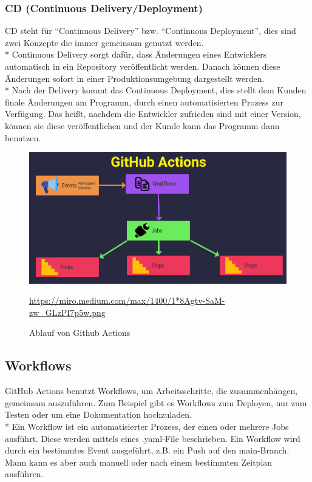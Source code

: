 \subsubsection{CD (Continuous Delivery/Deployment)}
\label{sec:CD}
CD steht für ``Continuous Delivery'' bzw. ``Continuous Deployment'', dies sind zwei Konzepte die immer gemeinsam genutzt werden. \\*
Continuous Delivery sorgt dafür, dass Änderungen eines Entwicklers automatisch in ein Repository veröffentlicht werden. Danach können diese Änderungen sofort in einer Produktionsumgebung
dargestellt werden. \\*
Nach der Delivery kommt das Continuous Deployment, dies stellt dem Kunden finale Änderungen am Programm, durch einen automatisierten Prozess zur Verfügung.
Das heißt, nachdem die Entwickler zufrieden sind mit einer Version, können sie diese veröffentlichen und der Kunde kann das Programm dann benutzen.\cite{RHatCICD}
\pagebreak

\begin{figure}[htp]
    \centering
    \author{Percy Bolmer}
    \includegraphics[scale=0.4]{pics/gh_actions_grafik.png}
    \caption{Ablauf von Github Actions}
    \small \url{https://miro.medium.com/max/1400/1*8Agtv-SaM-zw_GLzPI7p5w.png} 
    \label{fig:impl:GHActionAb}
\end{figure}

\subsection{Workflows}
GitHub Actions benutzt Workflows, um Arbeitsschritte, die zusammenhängen, gemeinsam auszuführen. Zum Beispiel gibt es Workflows zum Deployen, nur zum Testen oder um eine Dokumentation hochzuladen.\\*
Ein Workflow ist ein automatisierter Prozess, der einen oder mehrere Jobs ausführt.
Diese werden mittels eines .yaml-File beschrieben. Ein Workflow wird durch ein bestimmtes Event ausgeführt, z.B. ein Push auf den main-Branch. Mann kann es aber auch manuell oder nach einem
bestimmten Zeitplan ausführen. \cite{GHAction}

